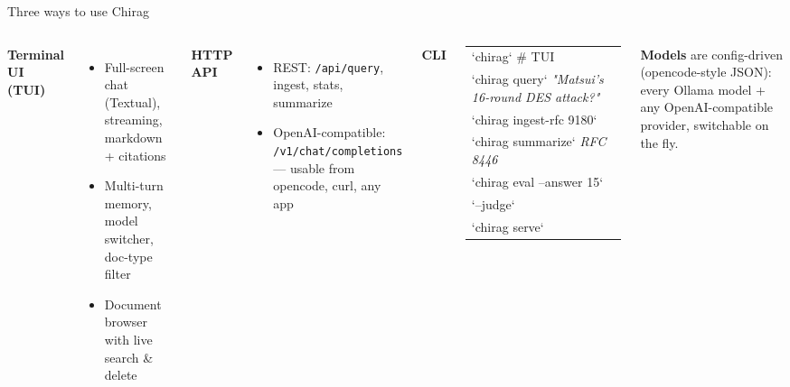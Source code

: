 \documentclass[aspectratio=169]{beamer}
\begin{document}
\begin{frame}{Three ways to use Chirag}
  \begin{columns}[t, totalwidth=\linewidth]
      \textbf{Terminal UI (TUI)}\\[2pt]
      \begin{itemize}
        \item Full-screen chat (Textual), streaming, markdown + citations
        \item Multi-turn memory, model switcher, doc-type filter
        \item Document browser with live search \& delete
      \end{itemize}
      \vspace{2mm}
      \textbf{HTTP API}\\[2pt]
      \begin{itemize}
        \item REST: \texttt{/api/query}, ingest, stats, summarize
        \item OpenAI-compatible: \texttt{/v1/chat/completions} --- usable
          from opencode, curl, any app
      \end{itemize}
      \textbf{CLI}\\[2pt]
      \scriptsize
      {\ttfamily
        \begin{tabular}{@{}l@{}}
          `chirag` \hspace{2pt} \# TUI\\
          `chirag query` \emph{"Matsui's 16-round DES attack?"}\\
          `chirag ingest-rfc 9180`\\
          `chirag summarize` \emph{RFC 8446}\\
          `chirag eval --answer 15`\\
          \hspace{6pt} `--judge`\\
          `chirag serve`
        \end{tabular}
      }
      \vspace{2mm}
      \textbf{Models} are config-driven (opencode-style JSON): every
      Ollama model + any OpenAI-compatible provider, switchable on the fly.
  \end{columns}
\end{frame}
\end{document}
